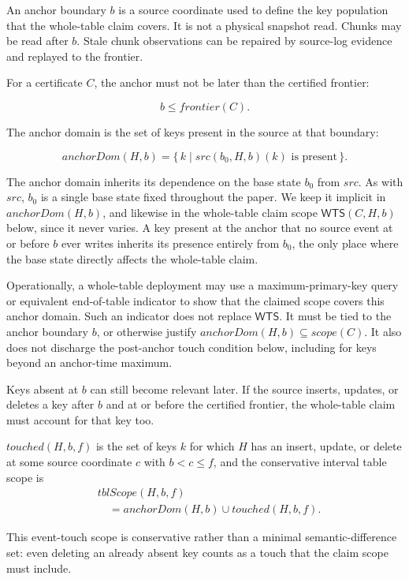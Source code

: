 \documentclass[letterpaper,10pt,twocolumn]{article}
\newcommand{\Src}{\mathit{src}}
\newcommand{\Scope}{\mathit{scope}}
\newcommand{\Frontier}{\mathit{frontier}}
\newcommand{\AnchorDomain}{\mathit{anchorDom}}
\newcommand{\TouchedBetween}{\mathit{touched}}
\newcommand{\TableScopeBetween}{\mathit{tblScope}}
\newcommand{\WTS}{\mathsf{WTS}}
\begin{document}
An anchor boundary $b$ is a source coordinate used to define the key
population that the whole-table claim covers. It is not a
physical snapshot read. Chunks may be read after $b$. Stale chunk observations can
be repaired by source-log evidence and replayed to the frontier.

For a certificate $C$, the anchor must not be later than the
certified frontier:

\[
b \le \Frontier(C).
\]

The anchor domain is the set of keys present in the source at that
boundary:

\[
  \AnchorDomain(H,b)
    = \{\,k \mid \Src(b_0,H,b)(k) \text{ is present}\,\}.
\]

The anchor domain inherits its dependence on the base state $b_0$ from
$\Src$. As with $\Src$, $b_0$ is a single base state fixed throughout the
paper. We keep it implicit in $\AnchorDomain(H,b)$, and likewise in the
whole-table claim scope $\WTS(C,H,b)$ below, since it never varies. A
key present at the anchor that no source event at or before $b$ ever
writes inherits its presence entirely from $b_0$, the only place where the
base state directly affects the whole-table claim.

Operationally, a whole-table deployment may use a maximum-primary-key
query or equivalent end-of-table indicator to show that the claimed scope
covers this anchor domain. Such an indicator does not replace $\WTS$. It
must be tied to the anchor boundary $b$, or otherwise justify
$\AnchorDomain(H,b) \subseteq \Scope(C)$. It also does not discharge the
post-anchor touch condition below, including for keys beyond an
anchor-time maximum.

Keys absent at $b$ can still become relevant later. If the source
inserts, updates, or deletes a key after $b$ and at or before the
certified frontier, the whole-table claim must account for that key too.

$\TouchedBetween(H,b,f)$ is the set of keys $k$ for which $H$
has an insert, update, or delete at some source coordinate $c$
with $b < c \le f$, and the conservative interval table scope is
\[
\begin{aligned}
&\TableScopeBetween(H,b,f)\\
&\quad= \AnchorDomain(H,b) \cup \TouchedBetween(H,b,f).
\end{aligned}
\]

This event-touch scope is conservative rather than a minimal
semantic-difference set: even deleting an already absent key counts as
a touch that the claim scope must include.
\end{document}
